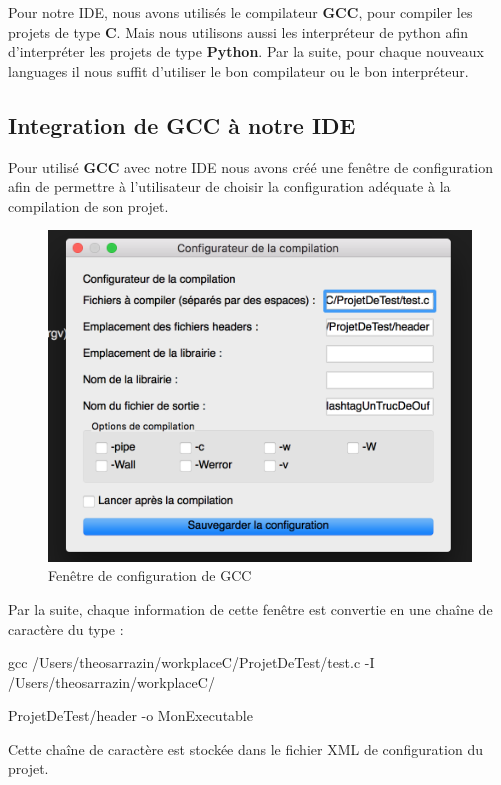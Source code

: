 \documentclass[a4paper,12pt]{article}
\begin{document}
		Pour notre IDE, nous avons utilisés le compilateur \textbf{GCC}, pour compiler les projets de type \textbf{C}. Mais nous utilisons aussi les interpréteur de python afin d'interpréter les projets de type \textbf{Python}. Par la suite, pour chaque nouveaux languages il nous suffit d'utiliser le bon compilateur ou le bon interpréteur.
		
	\subsection{Integration de \textbf{GCC} à notre IDE}

		Pour utilisé \textbf{GCC} avec notre IDE nous avons créé une fenêtre de configuration afin de permettre à l'utilisateur de choisir la configuration adéquate à la compilation de son projet.

			\begin{figure}[h!]
				\begin{center}
					\includegraphics[scale=0.7]{imgs/fenCompEx}
					\caption{Fenêtre de configuration de GCC}
				\end{center}
			\end{figure}

		Par la suite, chaque information de cette fenêtre est convertie en une chaîne de caractère du type : 

		gcc /Users/theosarrazin/workplaceC/ProjetDeTest/test.c  -I /Users/theosarrazin/workplaceC/

		ProjetDeTest/header -o MonExecutable

		Cette chaîne de caractère est stockée dans le fichier XML de configuration du projet.
\end{document}
